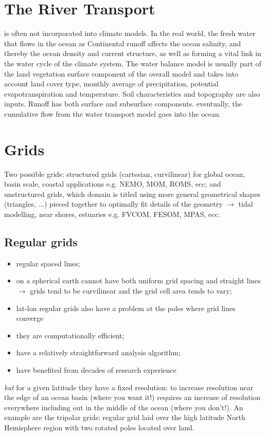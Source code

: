 \chapter{The River Transport} is often not incorporated into climate models. In the real world, the fresh water that flows in the ocean as Continental runoff affects the ocean salinity, and thereby the ocean density and current structure, as well as forming a vital link in the water cycle of the climate system.  The water balance model is usually  part of the land vegetation surface component of the overall model and takes into account land cover type, monthly average of precipitation, potential evapotranspiration and temperature. Soil characteristics and topography are also inputs. Runoff has both surface and subsurface components. eventually, the cumulative flow from the water transport model goes into the ocean.

\chapter{Grids}
Two possible grids: structured grids (cartesian, curvilinear) for global ocean, basin scale, coastal applications e.g. NEMO, MOM, ROMS, ecc; and unstructured grids, which domain is titled using more general geometrical shapes (triangles, ...) pieced together to optimally fit details of the geometry $\rightarrow$ tidal modelling, near shores, estuaries e.g. FVCOM, FESOM, MPAS, ecc.
\section{Regular grids}
\begin{itemize}
	\item regular spaced lines;
	\item on a spherical earth cannot have both uniform grid spacing and straight lines $\rightarrow$ grids tend to be curvilinear and the grid cell area tends to vary;
	\item lat-lon regular grids also have a problem at the poles where grid lines converge
	\item they are computationally efficient;
	\item have a relatively straightforward analysis algorithm;
	\item have benefited from decades of research experience
\end{itemize}
\textit{but} for a given latitude they have a fixed resolution: to increase resolution near the edge of an ocean basin (where you want it!) requires an increase of resolution everywhere including out in the middle of the ocean (where you don't!). An example are the tripolar grids: regular grid laid over the high latitude North Hemisphere region with two rotated poles located over land.
